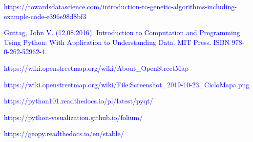 \documentclass[a4paper, twoside, 12pt, justified]{article}
\begin{document}
\begin{thebibliography}{}
		{\hypertarget{mutation}{\textcolor{blue}{
		https://towardsdatascience.com/introduction-to-genetic-algorithms-including-example-code-e396e98d8bf3}}}
	
		{\hypertarget{python}{\textcolor{blue}{
		 Guttag, John V. (12.08.2016). Introduction to Computation and Programming Using Python: With Application to Understanding Data. MIT Press. ISBN 978-0-262-52962-4.}}}
	 
	 	{\hypertarget{osm}{\textcolor{blue}{
		https://wiki.openstreetmap.org/wiki/About\_OpenStreetMap}}}
		
		
		{\hypertarget{osm_photo}{\textcolor{blue}{
		https://wiki.openstreetmap.org/wiki/File:Screenshot\_2019-10-23\_CicloMapa.png
		}}}
	
		{\hypertarget{pyqt}{\textcolor{blue}{
		https://python101.readthedocs.io/pl/latest/pyqt/
		}}}
	
	
		{\hypertarget{folium}{\textcolor{blue}{
		https://python-visualization.github.io/folium/
		}}}
	
		{\hypertarget{geopy}{\textcolor{blue}{
		https://geopy.readthedocs.io/en/stable/
		}}}
	
		

	\end{thebibliography}
	
	
	
\end{document}
